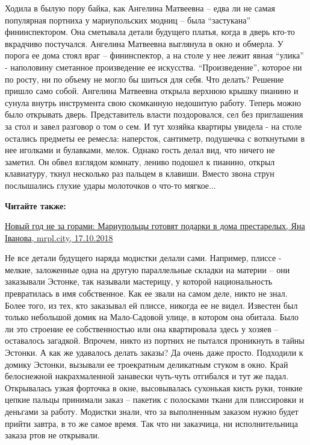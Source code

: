 Ходила в былую пору байка, как Ангелина Матвеевна – едва ли не самая популярная
портниха у мариупольских модниц – была \enquote{застукана} фининспектором. Она
сметывала детали будущего платья, когда в дверь кто-то вкрадчиво постучался.
Ангелина Матвеевна выглянула в окно и обмерла. У порога ее дома стоял враг –
фининспектор, а на столе у нее лежит явная \enquote{улика} - наполовину сметанное
произведение ее искусства.  \enquote{Произведение}, которое ни по росту, ни по объему
не могло бы шиться для себя. Что делать? Решение пришло само собой. Ангелина
Матвеевна открыла верхнюю крышку пианино и сунула внутрь инструмента свою
скомканную недошитую работу. Теперь можно было открывать дверь. Представитель
власти поздоровался, сел без приглашения за стол и завел разговор о том о сем.
И тут хозяйка квартиры увидела - на столе остались предметы ее ремесла:
наперсток, сантиметр, подушечка с воткнутыми в нее иголками и булавками, мелок.
Однако гость делал вид, что ничего не заметил. Он обвел взглядом комнату,
лениво подошел к пианино, открыл клавиатуру, ткнул несколько раз пальцем в
клавиши. Вместо звона струн послышались глухие удары молоточков о что-то
мягкое...

\textbf{Читайте также:} 

\href{https://mrpl.city/news/view/novyj-god-ne-za-gorami-mariupoltsy-gotovyat-podarki-v-doma-prestarelyh}{Новый год не за горами: Мариупольцы готовят подарки в дома престарелых, Яна Іванова, mrpl.city, 17.10.2018}

Не все детали будущего наряда модистки делали сами. Например, плиссе - мелкие,
заложенные одна на другую параллельные складки на материи – они заказывали
Эстонке, так называли мастерицу, у которой национальность превратилась в имя
собственное. Как ее звали на самом деле, никто не знал. Более того, из тех, кто
заказывал ей плиссе, никогда ее не видел. Известен был только небольшой домик
на Мало-Садовой улице, в котором она обитала. Было ли это строение ее
собственностью или она квартировала здесь у хозяев – оставалось загадкой.
Впрочем, никто из портних не пытался проникнуть в тайны Эстонки. А как же
удавалось делать заказы? Да очень даже просто. Подходили к домику Эстонки,
вызывали ее троекратным деликатным стуком в окно. Край белоснежной
накрахмаленной занавески чуть-чуть отгибался и тут же падал. Открывалась узкая
форточка в окне, высовывалась сухонькая кисть руки, тонкие цепкие пальцы
принимали заказ – пакетик с полосками ткани для плиссировки и деньгами за
работу. Модистки знали, что за выполненным заказом нужно будет прийти завтра, в
то же самое время. Так что ни заказчица, ни исполнительница заказа ртов не
открывали.

